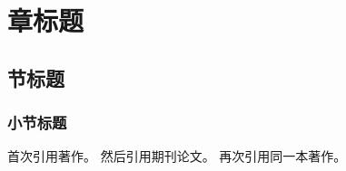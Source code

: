 \documentclass[doctor,numbering=sc,bibliography=numeric]{htuthesis}
\begin{document}
\mainmatter
\chapter{章标题}
\section{节标题}
\subsection{小节标题}

首次引用著作\parencite{timoshenko1959}。
然后引用期刊论文\parencite{chen2001}。
再次引用同一本著作\parencite[18]{timoshenko1959}。

\backmatter
\makebibliography
\end{document}
